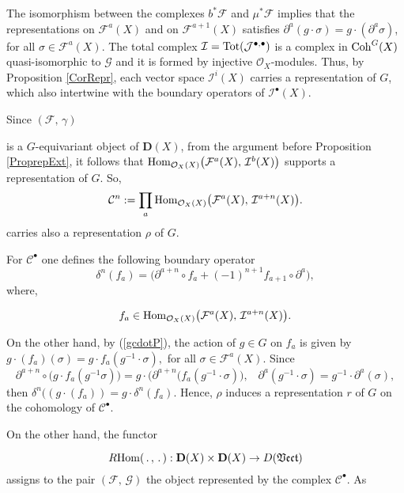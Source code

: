 \documentclass[xypic,amscd,syntonly,amssymb,verbatim,12pt]{amsart}
\theoremstyle{plain}
\theoremstyle{definition}
\theoremstyle{remark}
\numberwithin{equation}{section}
\begin{document}
   The isomorphism between the complexes $b^*{\mathcal F}$ and  $\mu^*{\mathcal F}$ implies that the representations on ${\mathcal F}^a(X)$
   and on  ${\mathcal F}^{a+1}(X)$ satisfies $\partial^a(g\cdot \sigma)=g\cdot(\partial^{a}\sigma)$, for all $\sigma\in{\mathcal F}^a(X)$.
The total complex  ${\mathcal I}={\rm Tot}({\mathcal J^{\bullet,\bullet}})$ is a complex
 in ${\rm Coh}^G(X)$  quasi-isomorphic to ${\mathcal G}$ and it is formed by injective ${\mathcal O}_X$-modules.
Thus, by Proposition \ref{CorRepr},   each vector space ${\mathcal
I}^i(X)$ carries a representation of $G$, which also intertwine with
the boundary operators of ${\mathcal I}^{\bullet}(X)$.

  Since $({\mathcal F},\,{\gamma})$
  
  is a
  $G$-equivariant object of ${\mathbf D}(X)$, from the argument before Proposition \ref{ProprepExt}, it follows that
  ${\rm Hom}_{ {\mathcal O}_X(X)}\big({\mathcal
  F}^a(X),\,{\mathcal I}^b(X)\big)$ supports a representation
  of $G$. So,
  \begin{equation}\label{Prod}
  {\mathcal C}^n:=\prod_{a}{\rm Hom}_{ {\mathcal O}_X(X)}\big({\mathcal
  F}^a(X),\,{\mathcal I}^{a+n}(X)\big).
   \end{equation}
  carries also a representation $\rho$ of $G$.
  
  For ${\mathcal C}^{\bullet}$ one defines the following boundary operator \cite[page 17]{Iversen}
  \begin{equation}\label{deltanfa}
  \delta^n(f_a)=\big(\partial^{a+n}\circ f_a+(-1)^{n+1}f_{a+1}\circ\partial ^a  \big),
  \end{equation}
  where,
 
    $$f_a\in{\rm Hom}_{{\mathcal O}_X(X)} \big({\mathcal
  F}^a(X),\,{\mathcal I}^{a+n}(X)\big).$$

  On the other hand, by (\ref{gcdotP}), the action of $g\in G$ on $f_a$ is
  given by  $g\cdot (f_a)(\sigma)=g\cdot f_a(g^{-1}\cdot \sigma), $ for all $\sigma\in{\mathcal F}^a(X)$.
  Since
  $$\partial^{a+n}\circ\big( g\cdot f_a(g^{-1}\sigma)  \big)=g\cdot\big( \partial^{a+n}(f_a(g^{-1}\cdot\sigma)  \big),\;\;\;
  \partial^a(g^{-1}\cdot\sigma)=g^{-1}\cdot\partial ^a(\sigma),$$
  then $\delta^n((g\cdot( f_a))=g\cdot \delta^n(f_a)$.
    Hence,  $\rho$  induces a representation $r$ of $G$ on the cohomology of ${\mathcal C}^{\bullet}$.

  On the other hand, the functor
  
  
  $$R{\rm Hom}(\,.\,,\,.\,):{\mathbf D}(X)\times {\mathbf D}(X)\to D(\mathfrak{Vect})$$
  assigns to the pair $({\mathcal F},\,{\mathcal G})$ the object
  represented by the complex ${\mathcal C}^{\bullet}$. As
  
\end{document}
